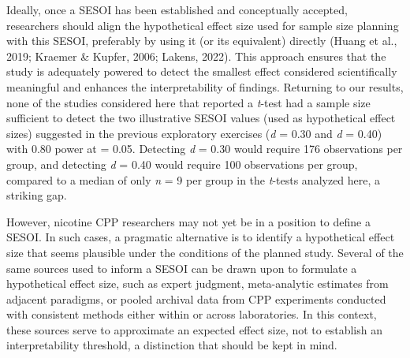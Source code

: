 \documentclass[authordate, meta, issue]{jote-new-article}
\begin{document}
	Ideally, once a SESOI has been established and conceptually accepted, researchers should align the hypothetical effect size used for sample size planning with this SESOI, preferably by using it (or its equivalent) directly (Huang et al., 2019; Kraemer \& Kupfer, 2006; Lakens, 2022). This approach ensures that the study is adequately powered to detect the smallest effect considered scientifically meaningful and enhances the interpretability of findings. Returning to our results, none of the studies considered here that reported a \emph{t}-test had a sample size sufficient to detect the two illustrative SESOI values (used as hypothetical effect sizes) suggested in the previous exploratory exercises (\emph{d} = 0.30 and \emph{d} = 0.40) with 0.80 power at \alpha = 0.05. Detecting \emph{d} = 0.30 would require 176 observations per group, and detecting \emph{d} = 0.40 would require 100 observations per group, compared to a median of only \emph{n} = 9 per group in the \emph{t}-tests analyzed here, a striking gap.



	However, nicotine CPP researchers may not yet be in a position to define a SESOI. In such cases, a pragmatic alternative is to identify a hypothetical effect size that seems plausible under the conditions of the planned study. Several of the same sources used to inform a SESOI can be drawn upon to formulate a hypothetical effect size, such as expert judgment, meta-analytic estimates from adjacent paradigms, or pooled archival data from CPP experiments conducted with consistent methods either within or across laboratories. In this context, these sources serve to approximate an expected effect size, not to establish an interpretability threshold, a distinction that should be kept in mind.
\end{document}
